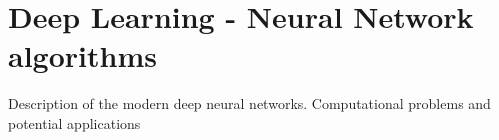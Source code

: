 \documentclass{standalone}
\begin{document}
\chapter[Deep Learning]{Deep Learning - Neural Network algorithms}\label{chapter2:neural}

Description of the modern deep neural networks.
Computational problems and potential applications
\end{document}
